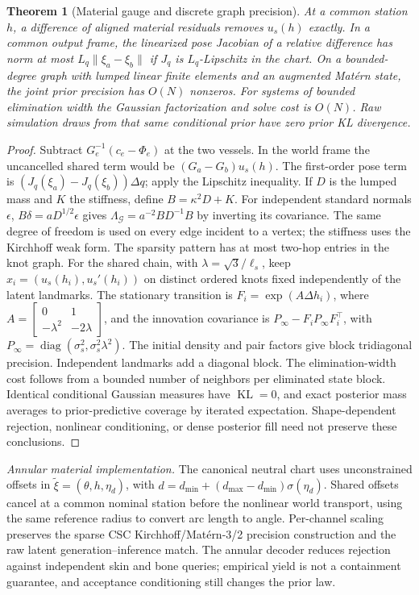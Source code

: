 \documentclass[11pt]{article}
\newtheorem{theorem}{Theorem}
\DeclareMathOperator{\KL}{KL}
\DeclareMathOperator{\diag}{diag}
\newcommand{\G}{\mathcal G}
\begin{document}
\begin{theorem}[Material gauge and discrete graph precision]\label{thm:graph}
At a common station $h$, a difference of aligned material residuals removes
$u_s(h)$ exactly. In a common output frame, the linearized pose Jacobian of
a relative difference has norm at most $L_q\|\xi_a-\xi_b\|$ if $J_q$ is
$L_q$-Lipschitz in the chart. On a bounded-degree graph with lumped linear
finite elements and an augmented Mat\'ern state, the joint prior precision
has $O(N)$ nonzeros. For systems of bounded elimination width the Gaussian
factorization and solve cost is $O(N)$. Raw simulation draws from that same
conditional prior have zero prior KL divergence.
\end{theorem}
\begin{proof}
Subtract $G_e^{-1}(c_e-\Phi_e)$ at the two vessels. In the world frame the
uncancelled shared term would be $(G_a-G_b)u_s(h)$.
The first-order pose term is $(J_q(\xi_a)-J_q(\xi_b))\Delta q$;
apply the Lipschitz inequality. If $D$ is the lumped mass and $K$ the
stiffness, define $B=\kappa^2D+K$. For independent standard normals $\epsilon$,
$B\delta=aD^{1/2}\epsilon$ gives $\Lambda_{\G}=a^{-2}BD^{-1}B$ by inverting its
covariance. The same degree of freedom is used on every edge incident to a
vertex; the stiffness uses the Kirchhoff weak form. The sparsity pattern has
at most two-hop entries in the knot graph. For the shared chain, with
$\lambda=\sqrt{3}/\ell_s$, keep $x_i=(u_s(h_i),u_s'(h_i))$ on distinct
ordered knots fixed independently of the latent landmarks.
The stationary transition is $F_i=\exp(A\Delta h_i)$, where
$A=\left[\begin{smallmatrix}0&1\\-\lambda^2&-2\lambda\end{smallmatrix}\right]$,
and the innovation covariance is $P_\infty-F_i P_\infty F_i^\top$, with
$P_\infty=\diag(\sigma_s^2,\sigma_s^2\lambda^2)$. The initial density and
pair factors give block tridiagonal precision. Independent landmarks add a
diagonal block. The elimination-width cost follows from a bounded number of
neighbors per eliminated state block. Identical conditional Gaussian measures
have $\KL=0$, and exact posterior mass averages to prior-predictive coverage
by iterated expectation. Shape-dependent rejection, nonlinear conditioning,
or dense posterior fill need not preserve these conclusions.
\end{proof}

\noindent\textit{Annular material implementation.}
The canonical neutral chart uses unconstrained offsets in
$\tilde{\xi}=(\theta,h,\eta_d)$, with
$d=d_{\min}+(d_{\max}-d_{\min})\sigma(\eta_d)$. Shared offsets cancel
at a common nominal station before the nonlinear world transport, using
the same reference radius to convert arc length to angle. Per-channel
scaling preserves the sparse CSC Kirchhoff/Mat\'ern-3/2 precision
construction and the raw latent generation--inference match. The annular
decoder reduces rejection against independent skin and bone queries;
empirical yield is not a containment guarantee, and acceptance
conditioning still changes the prior law.
\end{document}
